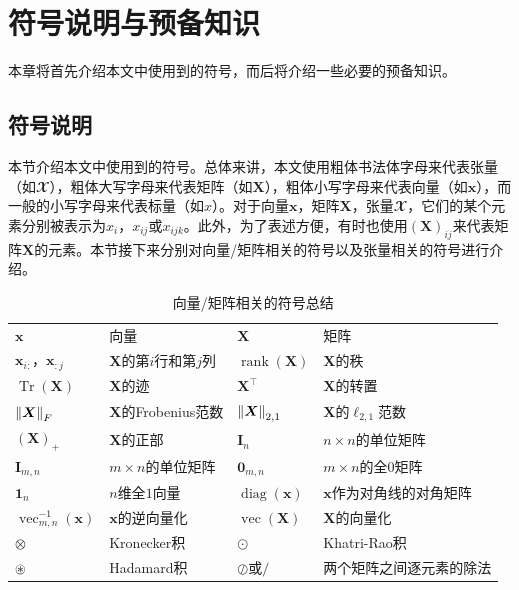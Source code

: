 \chapter{符号说明与预备知识}\label{chap:prelim}
本章将首先介绍本文中使用到的符号，而后将介绍一些必要的预备知识。

\section{符号说明}\label{sec:notation}
本节介绍本文中使用到的符号。总体来讲，本文使用粗体书法体字母来代表张量（如$\mathbfcal{X}$），粗体大写字母来代表矩阵（如$\boldsymbol{X}$），粗体小写字母来代表向量（如$\boldsymbol{x}$），而一般的小写字母来代表标量（如$x$）。对于向量$\boldsymbol{x}$，矩阵$\boldsymbol{X}$，张量$\mathbfcal{X}$，它们的某个元素分别被表示为$x_{i}$，$x_{i j}$或$x_{i j k}$。此外，为了表述方便，有时也使用$(\boldsymbol{X})_{i j}$来代表矩阵$\boldsymbol{X}$的元素。本节接下来分别对向量/矩阵相关的符号以及张量相关的符号进行介绍。

\begin{table}[!b]
\centering
\caption{向量/矩阵相关的符号总结}
\label{tab:matrix-notations}
\begin{tabular}{l|l|l|l}
\hline
$\boldsymbol{x}$ & 向量 & $\boldsymbol{X}$ & 矩阵 \\
$\boldsymbol{x}_{i:}$，$\boldsymbol{x}_{:j}$ & $\boldsymbol{X}$的第$i$行和第$j$列 & $\operatorname{rank}(\boldsymbol{X})$ & $\boldsymbol{X}$的秩 \\
$\operatorname{Tr}(\boldsymbol{X})$ & $\boldsymbol{X}$的迹 & $\boldsymbol{X}^{\top}$ & $\boldsymbol{X}$的转置 \\
$\left\lVert\boldsymbol{X}\right\rVert_F$ & $\boldsymbol{X}$的Frobenius范数 & $\left\lVert\boldsymbol{X}\right\rVert_{2,1}$ & $\boldsymbol{X}$的$\ell_{2,1}$范数 \\ $(\boldsymbol{X})_{+}$ & $\boldsymbol{X}$的正部 & $\boldsymbol{I}_{n}$ & $n\times n$的单位矩阵 \\
$\boldsymbol{I}_{m,n}$ & $m\times n$的单位矩阵 & $\boldsymbol{0}_{m,n}$ & $m\times n$的全$0$矩阵 \\ $\boldsymbol{1}_{n}$ & $n$维全$1$向量 & $\operatorname{diag}(\boldsymbol{x})$ & $\boldsymbol{x}$作为对角线的对角矩阵 \\
$\operatorname{vec}^{-1}_{m,n}(\boldsymbol{x})$ & $\boldsymbol{x}$的逆向量化 & $\operatorname{vec}(\boldsymbol{X})$ & $\boldsymbol{X}$的向量化 \\\hline
$\otimes$ & Kronecker积 & $\odot$ & Khatri-Rao积 \\ $\oast$ & Hadamard积 & $\oslash$或$/$& 两个矩阵之间逐元素的除法 \\ \hline
\end{tabular}
\end{table}

